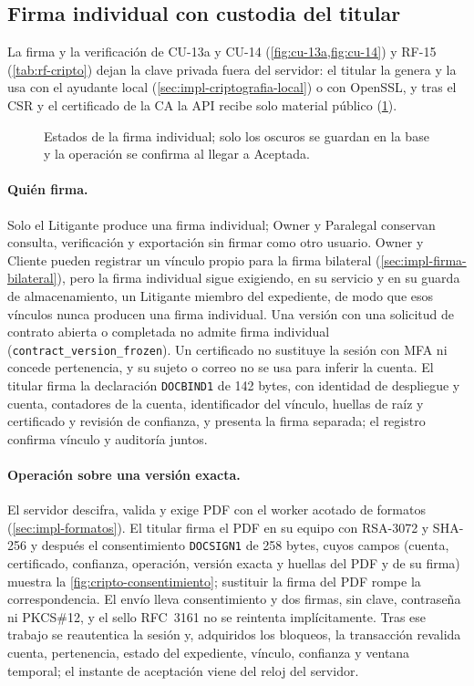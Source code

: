 \subsection{Firma individual con custodia del titular}
\label{sec:impl-firma-individual}

La firma y la verificación de CU-13a y CU-14 (\cref{fig:cu-13a,fig:cu-14}) y
RF-15 (\cref{tab:rf-cripto}) dejan la clave privada fuera del servidor: el
titular la genera y la usa con el ayudante local
(\cref{sec:impl-criptografia-local}) o con OpenSSL, y tras el CSR y el
certificado de la CA la API recibe solo material público
(\cref{fig:impl-firmaind-estados}).

\begin{figure}[!htbp]
  \centering
  
  \caption{Estados de la firma individual; solo los oscuros se guardan en la
    base y la operación se confirma al llegar a Aceptada.}
  \label{fig:impl-firmaind-estados}
\end{figure}

\paragraph{Quién firma.} Solo el Litigante produce una firma individual; Owner
y Paralegal conservan consulta, verificación y exportación sin firmar como otro
usuario. Owner y Cliente pueden registrar un vínculo propio para la firma
bilateral (\cref{sec:impl-firma-bilateral}), pero la firma individual sigue
exigiendo, en su servicio y en su guarda de almacenamiento, un Litigante
miembro del expediente, de modo que esos vínculos nunca producen una firma
individual. Una versión con una solicitud de contrato abierta o completada no
admite firma individual (\texttt{contract\_version\_frozen}). Un certificado no sustituye la sesión con MFA ni concede
pertenencia, y su sujeto o correo no se usa para inferir la cuenta. El titular
firma la declaración \texttt{DOCBIND1} de 142 bytes, con identidad de
despliegue y cuenta, contadores de la cuenta, identificador del vínculo,
huellas de raíz y certificado y revisión de confianza, y presenta la firma
separada; el registro confirma vínculo y auditoría juntos.

\paragraph{Operación sobre una versión exacta.} El servidor descifra, valida y
exige PDF con el worker acotado de formatos (\cref{sec:impl-formatos}). El
titular firma el PDF en su equipo con RSA-3072 y SHA-256 y después el
consentimiento \texttt{DOCSIGN1} de 258 bytes, cuyos campos (cuenta,
certificado, confianza, operación, versión exacta y huellas del PDF y de su
firma) muestra la \cref{fig:cripto-consentimiento}; sustituir la firma del PDF rompe la
correspondencia. El envío lleva consentimiento y dos firmas, sin clave,
contraseña ni PKCS\#12, y el sello RFC~3161 no se reintenta implícitamente. Tras
ese trabajo se reautentica la sesión y, adquiridos los bloqueos, la transacción
revalida cuenta, pertenencia, estado del expediente, vínculo, confianza y
ventana temporal; el instante de aceptación viene del reloj del servidor.

